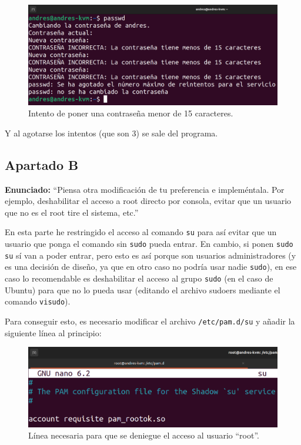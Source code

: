 \documentclass{article}
\begin{document}
\begin{figure}[H]
    \includegraphics[width=\textwidth]{imagenes/passwordminlen15passwd.png}
    \caption{Intento de poner una contraseña menor de 15 caracteres.}
\end{figure}

Y al agotarse los intentos (que son 3) se sale del programa.

\newpage

\subsection{Apartado B}

\textbf{Enunciado: }``Piensa otra modificación de tu preferencia e impleméntala. Por ejemplo, deshabilitar el acceso a root directo por consola, evitar que un usuario que no es el root tire el sistema, etc.''

\bigskip

En esta parte he restringido el acceso al comando \verb|su| para así evitar que un usuario que ponga el comando sin \verb|sudo| pueda entrar. En cambio, si ponen \verb|sudo su| sí van a poder entrar, pero esto es así porque son usuarios administradores (y es una decisión de diseño, ya que en otro caso no podría usar nadie \verb|sudo|), en ese caso lo recomendable es deshabilitar el acceso al grupo \verb|sudo| (en el caso de Ubuntu) para que no lo pueda usar (editando el archivo sudoers mediante el comando \verb|visudo|).

\bigskip

Para conseguir esto, es necesario modificar el archivo \verb|/etc/pam.d/su| y añadir la siguiente línea al principio:

\begin{figure}[H]
    \includegraphics[width=\textwidth]{imagenes/sudeny.png}
    \caption{Línea necesaria para que se deniegue el acceso al usuario ``root''.}
\end{figure}
\end{document}
